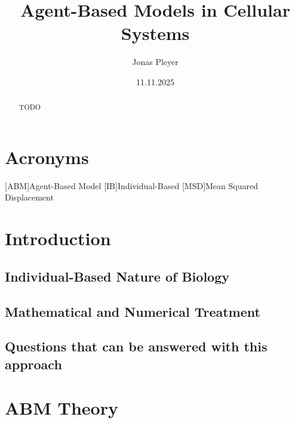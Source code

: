 \documentclass[a4paper]{article}
\title{Agent-Based Models in Cellular Systems}\let\Title\@title
\author{Jonas Pleyer}\let\Author\@author
\date{11.11.2025}\let\Date\@date
\begin{document}



\begin{abstract}
    TODO
\end{abstract}

\newpage
\tableofcontents
{}
\newpage

\listoffigures
\listoftables
\lstlistoflistings

\section*{Acronyms}
\begin{acronym}
    [ABM]{Agent-Based Model}
    [IB]{Individual-Based}
    [MSD]{Mean Squared Displacement}
\end{acronym}


\newpage
{}
\section{Introduction}
\subsection{Individual-Based Nature of Biology}
\subsection{Mathematical and Numerical Treatment}
\subsection{Questions that can be answered with this approach}

\pagebreak
\section{ABM Theory}
\end{document}
